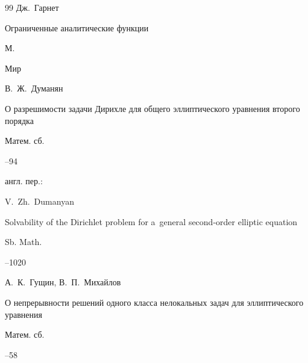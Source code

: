 \begin{thebibliography}{99}
\by Дж.~Гарнет

\book Ограниченные аналитические функции

\publaddr М. 

\publ Мир








\by В.~Ж.~Думанян

\paper О разрешимости задачи Дирихле для общего эллиптического уравнения второго порядка

\jour Матем. сб.




--94




\transl англ. пер.:~

\by V.~Zh.~Dumanyan

\paper Solvability of the Dirichlet problem for a~general second-order elliptic equation

\jour Sb. Math.




--1020








\by А.~К.~Гущин, В.~П.~Михайлов

\paper О непрерывности решений одного класса нелокальных задач для эллиптического уравнения

\jour Матем. сб.




--58


\end{thebibliography}
